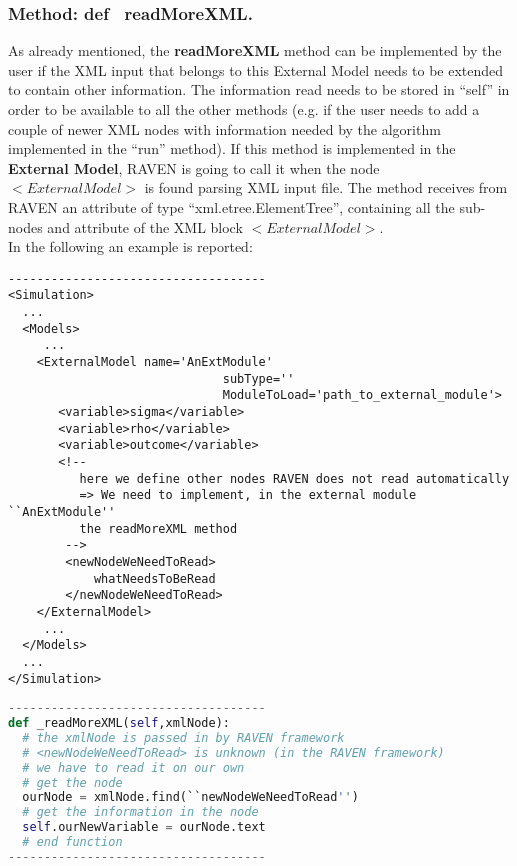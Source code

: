 \subsubsection{Method: def \textunderscore~readMoreXML.}
\label{subsubsec:externalReadMoreXML}
As already mentioned, the \textbf{readMoreXML} method can be implemented by the user if the XML input that belongs to this External Model needs to be extended to contain other information. The information read needs to be stored in ``self'' in order to be available to all the other methods (e.g. if the user needs to add a couple of newer XML nodes with information needed by the algorithm implemented in the ``run'' method).
If this method is implemented in the \textbf{External Model}, RAVEN is going to call it when the node $<ExternalModel>$ is found parsing XML input file. The method receives from RAVEN an attribute of type ``xml.etree.ElementTree'', containing all the sub-nodes and attribute of the XML block $<ExternalModel>$.
\\In the following an example is reported:
\begin{lstlisting}[style=XML]
------------------------------------
<Simulation> 
  ...
  <Models>
     ...
    <ExternalModel name='AnExtModule' 
                              subType='' 
                              ModuleToLoad='path_to_external_module'>  
       <variable>sigma</variable>
       <variable>rho</variable>
       <variable>outcome</variable>
       <!-- 
          here we define other nodes RAVEN does not read automatically 
          => We need to implement, in the external module ``AnExtModule''
          the readMoreXML method
        -->
        <newNodeWeNeedToRead>
            whatNeedsToBeRead
        </newNodeWeNeedToRead>
    </ExternalModel>
     ...
  </Models> 
  ...
</Simulation> 
\end{lstlisting}
\begin{lstlisting}[language=python]
------------------------------------
def _readMoreXML(self,xmlNode):
  # the xmlNode is passed in by RAVEN framework
  # <newNodeWeNeedToRead> is unknown (in the RAVEN framework)
  # we have to read it on our own
  # get the node
  ourNode = xmlNode.find(``newNodeWeNeedToRead'')
  # get the information in the node
  self.ourNewVariable = ourNode.text
  # end function
------------------------------------
\end{lstlisting}
